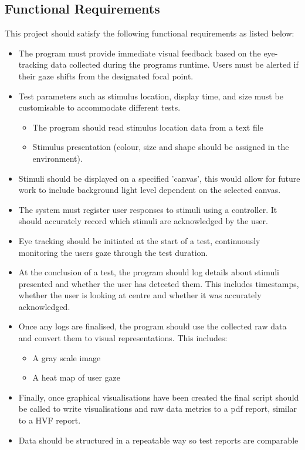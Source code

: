 \documentclass{l4proj}
\begin{document}
\subsection{Functional Requirements}
This project should satisfy the following functional requirements as listed below:
\begin{itemize}
    \item The program must provide immediate visual feedback based on the eye-tracking data collected during the programs runtime. Users must be alerted if their gaze shifts from the designated focal point.
    \item Test parameters such as stimulus location, display time, and size must be customisable to accommodate different tests.
    \begin{itemize}
        \item The program should read stimulus location data from a text file 
        \item Stimulus presentation (colour, size and shape should be assigned in  the environment).
    \end{itemize}
    \item Stimuli should be displayed on a specified 'canvas', this would allow for future work to include background light level dependent on the selected canvas.
    \item The system must register user responses to stimuli using a controller. It should accurately record which stimuli are acknowledged by the user.
    \item Eye tracking should be initiated at the start of a test, continuously monitoring the users gaze through the test duration.
    \item At the conclusion of a test, the program should log details about stimuli presented and whether the user has detected them. This includes timestamps, whether the user is looking at centre and whether it was accurately acknowledged. 
    \item Once any logs are finalised, the program should use the collected raw data and convert them to visual representations. This includes:
    \begin{itemize}
        \item A gray scale image
        \item A heat map of user gaze
    \end{itemize}
    \item Finally, once graphical visualisations have been created the final script should be called to write visualisations and raw data metrics to a pdf report, similar to a HVF report. 
    \item Data should be structured in a repeatable way so test reports are comparable
    

\end{itemize}
\end{document}
